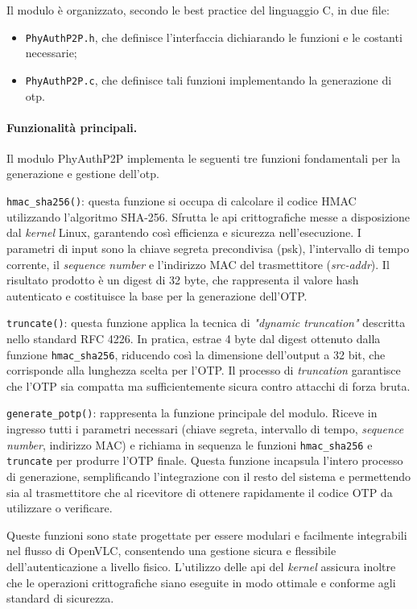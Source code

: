 \noindent Il modulo è organizzato, secondo le best practice del linguaggio C, in due file:
\begin{itemize}
    \item \texttt{PhyAuthP2P.h}, che definisce l'interfaccia dichiarando le funzioni e le costanti necessarie;
    \item \texttt{PhyAuthP2P.c}, che definisce tali funzioni implementando la generazione di \gls{otp}.
\end{itemize}

\paragraph{Funzionalità principali.}
Il modulo PhyAuthP2P implementa le seguenti tre funzioni fondamentali per la generazione e gestione dell'\gls{otp}.

\texttt{hmac\_sha256()}: questa funzione si occupa di calcolare il codice HMAC utilizzando l'algoritmo SHA-256. Sfrutta le \gls{api} crittografiche messe a disposizione dal \textit{kernel} Linux, garantendo così efficienza e sicurezza nell'esecuzione. I parametri di input sono la chiave segreta precondivisa (\gls{psk}), l'intervallo di tempo corrente, il \textit{sequence number} e l'indirizzo MAC del trasmettitore (\textit{src-addr}). Il risultato prodotto è un digest di 32 byte, che rappresenta il valore hash autenticato e costituisce la base per la generazione dell'OTP.

\texttt{truncate()}: questa funzione applica la tecnica di \textit{"dynamic truncation"} descritta nello standard RFC 4226. In pratica, estrae 4 byte dal digest ottenuto dalla funzione \texttt{hmac\_sha256}, riducendo così la dimensione dell'output a 32 bit, che corrisponde alla lunghezza scelta per l'OTP. Il processo di \textit{truncation} garantisce che l'OTP sia compatta ma sufficientemente sicura contro attacchi di forza bruta.

\texttt{generate\_potp()}: rappresenta la funzione principale del modulo. Riceve in ingresso tutti i parametri necessari (chiave segreta, intervallo di tempo, \textit{sequence number}, indirizzo MAC) e richiama in sequenza le funzioni \texttt{hmac\_sha256} e \texttt{truncate} per produrre l'OTP finale. Questa funzione incapsula l'intero processo di generazione, semplificando l'integrazione con il resto del sistema e permettendo sia al trasmettitore che al ricevitore di ottenere rapidamente il codice OTP da utilizzare o verificare.

Queste funzioni sono state progettate per essere modulari e facilmente integrabili nel flusso di OpenVLC, consentendo una gestione sicura e flessibile dell'autenticazione a livello fisico. L'utilizzo delle \gls{api} del \textit{kernel} assicura inoltre che le operazioni crittografiche siano eseguite in modo ottimale e conforme agli standard di sicurezza.

